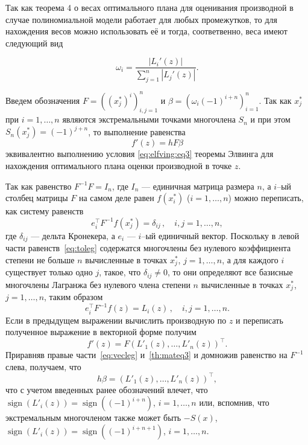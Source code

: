 \documentclass[specialist,
               substylefile = spbu.rtx,
               subf,href,colorlinks=true, 12pt]{disser}
\theoremstyle{definition}
\DeclareMathOperator*{\sign}{sign}
\newcommand\abs[1]{\left\lvert#1\right\rvert}
\begin{document}
	Так как теорема 4 о весах оптимального плана для оценивания производной в случае полиномиальной модели работает для любых промежутков, то для нахождения весов можно использовать её и тогда, соответвенно, веса имеют следующий вид
	
	\begin{equation*}
		\omega_i = \frac{\abs{L_i'(z)}}{\sum_{j=1}^n \abs{L_j'(z)}}.
	\end{equation*}
	
	Введем обозначения $F = \left((x_j^*)^i\right)^n_{i, j = 1}$ и $\beta = \left( \omega_i (-1)^{i+n} \right)_{i=1}^n$. Так как $x_j^*$ при $i = 1, \ldots , n$ являются экстремальными точками многочлена $S_n$ и при этом $S_n(x_j^*) = (-1)^{j+n}$, то выполнение равенства 
	\begin{equation}
		\label{th:mateq3}
		f'(z) = hF\beta
	\end{equation}
	 эквивалентно выполнению условия \eqref{eq:elfving:eq3} теоремы Элвинга для нахождения оптимального плана оценки производной в точке $z$.
	 
	Так как равенство $F^{-1}F = I_n$, где $I_n$ --- единичная матрица размера $n$, а $i$--ый столбец матрицы $F$ на самом деле равен $f(x_i^*)$ ($i = 1, \ldots, n$) можно переписать, как систему равенств
	\begin{equation}
		\label{eq:toleg}
		e_i^{\top} F^{-1} f(x_j^*) = \delta_{ij} \, , \quad i, j = 1, \ldots , n ,
	\end{equation}
	где $\delta_{ij}$ --- дельта Кронекера, а $e_i$ --- $i$--ый единичный вектор. Поскольку в левой части равенств~\eqref{eq:toleg} содержатся многочлены без нулевого коэффициента степени не больше $n$ вычисленные в точках $x_j^*$, $j=1, \ldots , n$, а для каждого $i$ существует только одно $j$, такое, что $\delta_{ij} \neq 0$, то они определяют все базисные многочлены Лагранжа без нулевого члена степени $n$ вычисленные в точках $x_j^*$, $j=1, \ldots , n$, таким образом
	\begin{equation}
		\label{eq:leg}
		e_i^{\top} F^{-1} f(z) = L_i(z) \, , \quad i, j = 1, \ldots , n .
	\end{equation}
	Если в предыдущем выражении вычислить производную по $z$ и переписать полученное выражение в векторной форме получим
	\begin{equation}
		\label{eq:vecleg}
		f'(z) = F \left( L'_1(z), \ldots, L'_n(z) \right)^\top.
	\end{equation}
	Приравняв правые части~\eqref{eq:vecleg} и~\eqref{th:mateq3} и домножив равенство на $F^{-1}$ слева, получаем, что
	\begin{equation}
		\label{eq:vecleg}
		h \beta = \left( L'_1(z), \ldots, L'_n(z) \right)^\top,
	\end{equation}
	что с учетом введенных ранее обозначений влечет, что $\sign (L'_i(z)) = \sign((-1)^{i+n}) $, $i = 1, \ldots, n$ или, вспомнив, что экстремальным многочленом также может быть $-S(x)$,  $\sign (L'_i(z)) = \sign((-1)^{i+n+1}) $, $i = 1, \ldots, n$.
	
\end{document}
